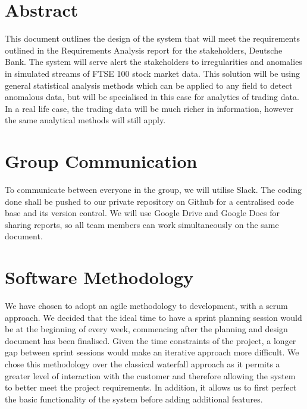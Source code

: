\documentclass[11pt, oneside, a4paper]{article}
\begin{document}
\clearpage
\maketitle
\thispagestyle{empty}

\newpage
\setcounter{page}{1}

\section{Abstract}

This document outlines the design of the system that will meet the requirements
outlined in the Requirements Analysis report for the stakeholders, Deutsche Bank.
The system will serve alert the stakeholders to irregularities and anomalies in
simulated streams of FTSE 100 stock market data. This solution will be using general
statistical analysis methods which can be applied to any field to detect anomalous
data, but will be specialised in this case for analytics of trading data. In a real
life case, the trading data will be much richer in information, however the same
analytical methods will still apply.

\section{Group Communication}

To communicate between everyone in the group, we will utilise Slack. The coding
done shall be pushed to our private repository on Github for a centralised code
base and its version control. We will use Google Drive and Google Docs for sharing
reports, so all team members can work simultaneously on the same document.

\section{Software Methodology}

We have chosen to adopt an agile methodology to development, with
a scrum approach. We decided that the ideal time to have a sprint planning session
would be at the beginning of every week, commencing after the planning and design
document has been finalised. Given the time constraints of the project, a longer
gap between sprint sessions would make an iterative approach more difficult. We
chose this methodology over the classical waterfall approach as it permits a greater
level of interaction with the customer and therefore allowing the system to better
meet the project requirements. In addition, it allows us to first perfect the basic
functionality of the system before adding additional features.
\end{document}
